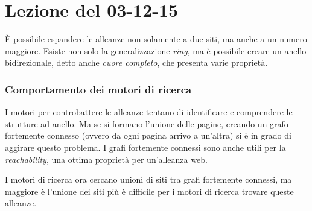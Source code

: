 \section{Lezione del 03-12-15}

\`E possibile espandere le alleanze non solamente a due siti, ma anche a un numero maggiore. Esiste non solo la generalizzazione \textit{ring}, ma \`e possibile creare un anello bidirezionale, detto anche \textit{cuore completo}, che presenta varie propriet\`a.

\subsubsection{Comportamento dei motori di ricerca}I motori per controbattere le alleanze tentano di identificare e comprendere le strutture ad anello. Ma se si formano l'unione delle pagine, creando un grafo fortemente connesso (ovvero da ogni pagina arrivo a un'altra) si \`e in grado di aggirare questo problema. I grafi fortemente connessi sono anche utili per la \textit{reachability}, una ottima propriet\`a per un'alleanza web.

I motori di ricerca ora cercano unioni di siti tra grafi fortemente connessi, ma maggiore \`e l'unione dei siti pi\`u \`e difficile per i motori di ricerca trovare queste alleanze.

